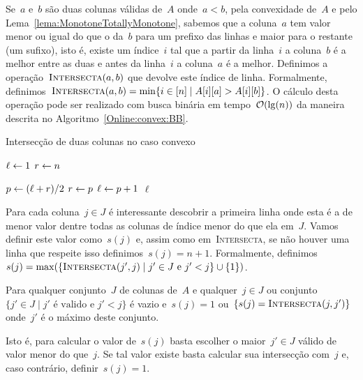 Se~$a$ e~$b$ são duas colunas válidas de~$A$ onde~$a < b$, pela convexidade de~$A$ e pelo Lema~\ref{lema:MonotoneTotallyMonotone}, sabemos que a coluna~$a$ tem valor menor ou igual do que o da~$b$ para um prefixo das linhas e maior para o restante (um sufixo), isto é, existe um índice~$i$ tal que a partir da linha~$i$ a coluna~$b$ é a melhor entre as duas e antes da linha~$i$ a coluna~$a$ é a melhor. Definimos a operação~$\textsc{Intersecta}(a,b)$ que devolve este índice de linha. Formalmente, definimos~${\textsc{Intersecta}(a,b) = \min\{ i \in [n] \mid A[i][a] > A[i][b] \}}$. O cálculo desta operação pode ser realizado com busca binária em tempo~$\mathcal{O}(\lg(n))$ da maneira descrita no Algoritmo~\ref{Online:convex:BB}.

\begin{algorithm}[h]
\caption{Intersecção de duas colunas no caso convexo}
\label{Online:convex:BB}
\begin{algorithmic}[1]
    \State $\ell \leftarrow 1$
    \State $r \leftarrow n$

        \State $p \leftarrow (\ell + r)/2$
         \label{Online:convex:BB:ineq}
            \State $r \leftarrow p$
        \Else
            \State $\ell \leftarrow p+1$
        \EndIf
    \EndWhile
    \State \Return $\ell$
\EndFunction
\end{algorithmic}
\end{algorithm}

Para cada coluna~$j \in J$ é interessante descobrir a primeira linha onde esta é a de menor valor dentre todas as colunas de índice menor do que ela em~$J$. Vamos definir este valor como~$s(j)$ e, assim como em~\textsc{Intersecta}, se não houver uma linha que respeite isso definimos~$s(j) = n+1$. Formalmente, definimos~${s(j) = \max(\{ \textsc{Intersecta}(j',j) \mid j' \in J \text{ e } j' < j\} \cup \{1\})}$.

\begin{prop} \label{Online:convex:easys}
Para qualquer conjunto~$J$ de colunas de~$A$ e qualquer~$j \in J$ ou conjunto~${\{j' \in J \mid j' \text{ é valido e } j' < j\}}$ é vazio e~$s(j) = 1$ ou~$\{s(j) = \textsc{Intersecta}(j,j')\}$ onde~$j'$ é o máximo deste conjunto.

Isto é, para calcular o valor de~$s(j)$ basta escolher o maior~$j' \in J$ válido de valor menor do que~$j$. Se tal valor existe basta calcular sua intersecção com~$j$ e, caso contrário, definir~$s(j) = 1$.
\end{prop}

